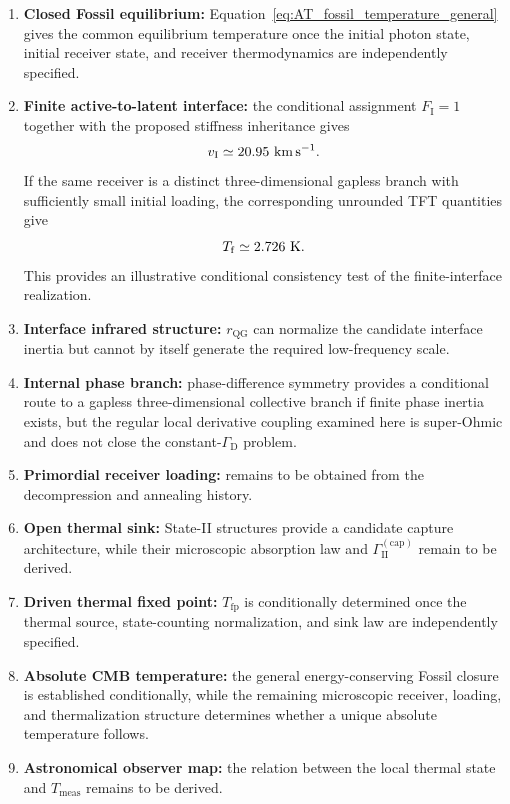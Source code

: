 \begin{enumerate}
    \item
    \textbf{Closed Fossil equilibrium:}
    Equation~\eqref{eq:AT_fossil_temperature_general}
    gives the common equilibrium temperature once the initial photon state,
    initial receiver state, and receiver thermodynamics are independently
    specified.

    \item
    \textbf{Finite active-to-latent interface:}
    the conditional assignment
    \(F_{\mathrm I}=1\)
    together with the proposed stiffness inheritance gives
    \[
        v_{\mathrm I}
        \simeq
        20.95~{\rm km\,s^{-1}}.
    \]
    If the same receiver is a distinct three-dimensional gapless branch with
    sufficiently small initial loading, the corresponding unrounded TFT
    quantities give
    \[
        T_{\mathrm f}
        \simeq
        2.726~{\rm K}.
    \]
    This provides an illustrative conditional consistency test of the
    finite-interface realization.

    \item
    \textbf{Interface infrared structure:}
    \(r_{\mathrm{QG}}\)
    can normalize the candidate interface inertia but cannot by itself
    generate the required low-frequency scale.

    \item
    \textbf{Internal phase branch:}
    phase-difference symmetry provides a conditional route to a gapless
    three-dimensional collective branch if finite phase inertia exists, but
    the regular local derivative coupling examined here is super-Ohmic and
    does not close the constant-\(\Gamma_{\mathrm D}\) problem.

    \item
    \textbf{Primordial receiver loading:}
    remains to be obtained from the decompression and annealing history.

    \item
    \textbf{Open thermal sink:}
    State-II structures provide a candidate capture architecture, while their
    microscopic absorption law and
    \(\Gamma_{\mathrm{II}}^{(\mathrm{cap})}\)
    remain to be derived.

    \item
    \textbf{Driven thermal fixed point:}
    \(T_{\mathrm{fp}}\)
    is conditionally determined once the thermal source, state-counting
    normalization, and sink law are independently specified.

    \item
    \textbf{Absolute CMB temperature:}
    the general energy-conserving Fossil closure is established conditionally,
    while the remaining microscopic receiver, loading, and thermalization
    structure determines whether a unique absolute temperature follows.

    \item
    \textbf{Astronomical observer map:}
    the relation between the local thermal state and
    \(T_{\mathrm{meas}}\)
    remains to be derived.

\end{enumerate}

